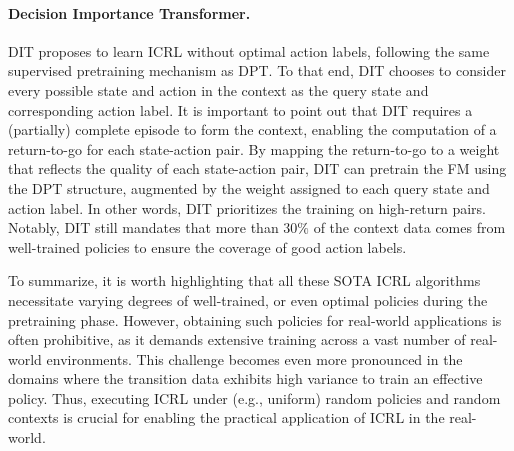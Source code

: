 \paragraph{Decision Importance Transformer.}

DIT proposes to learn ICRL without optimal action labels, following the same supervised pretraining mechanism as DPT.
%
To that end, DIT chooses to consider every possible state and action in the context as the query state and corresponding action label. 
%
It is important to point out that DIT requires a (partially) complete episode to form the context, enabling the computation of a return-to-go for each state-action pair. By mapping the return-to-go to a weight that reflects the quality of each state-action pair, DIT can pretrain the FM using the DPT structure, augmented by the weight assigned to each query state and action label. 
%
In other words, DIT prioritizes the training on high-return pairs.
%
Notably, DIT still mandates that more than $30\%$ of the context data comes from well-trained policies to ensure the coverage of good action labels.




To summarize, it is worth highlighting that all these SOTA ICRL algorithms necessitate varying degrees of well-trained, or even optimal policies during the pretraining phase.
%
However, obtaining such policies for real-world applications is often prohibitive, as it demands extensive training across a vast number of real-world environments.
%
This challenge becomes even more pronounced in the domains where the transition data exhibits high variance to train an effective policy.
%
%
Thus, executing ICRL under (e.g., uniform) random policies and random contexts is crucial for enabling the practical application of ICRL in the real-world.






